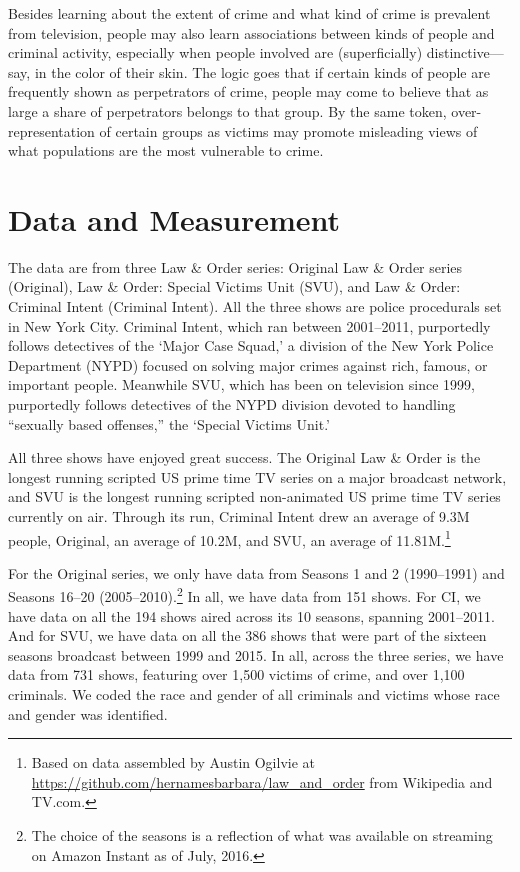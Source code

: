 \documentclass[12pt, letterpaper]{article}
\begin{document}
Besides learning about the extent of crime and what kind of crime is prevalent from television, people may also learn associations between kinds of people and criminal activity, especially when people involved are (superficially) distinctive---say, in the color of their skin. The logic goes that if certain kinds of people are frequently shown as perpetrators of crime, people may come to believe that as large a share of perpetrators belongs to that group. By the same token, over-representation of certain groups as victims may promote misleading views of what populations are the most vulnerable to crime.

\section*{Data and Measurement}
The data are from three Law \& Order series: Original Law \& Order series (Original), Law \& Order: Special Victims Unit (SVU), and Law \& Order: Criminal Intent (Criminal Intent). All the three shows are police procedurals set in New York City. Criminal Intent, which ran between 2001--2011, purportedly follows detectives of the `Major Case Squad,' a division of the New York Police Department (NYPD) focused on solving major crimes against rich, famous, or important people. Meanwhile SVU, which has been on television since 1999, purportedly follows detectives of the NYPD division devoted to handling ``sexually based offenses,'' the `Special Victims Unit.'

All three shows have enjoyed great success. The Original Law \& Order is the longest running scripted US prime time TV series on a major broadcast network, and SVU is the longest running scripted non-animated US prime time TV series currently on air. Through its run, Criminal Intent drew an average of 9.3M people, Original, an average of 10.2M, and SVU, an average of 11.81M.\footnote{Based on data assembled by Austin Ogilvie at \href{https://github.com/hernamesbarbara/law_and_order}{https://github.com/hernamesbarbara/law\_and\_order} from Wikipedia and TV.com.}

For the Original series, we only have data from Seasons 1 and 2 (1990--1991) and Seasons 16--20 (2005--2010).\footnote{The choice of the seasons is a reflection of what was available on streaming on Amazon Instant as of July, 2016.} In all, we have data from 151 shows. For CI, we have data on all the 194 shows aired across its 10 seasons, spanning 2001--2011. And for SVU, we have data on all the 386 shows that were part of the sixteen seasons broadcast between 1999 and 2015. In all, across the three series, we have data from 731 shows, featuring over 1,500 victims of crime, and over 1,100 criminals.  We coded the race and gender of all criminals and victims whose race and gender was identified. 
\end{document}
